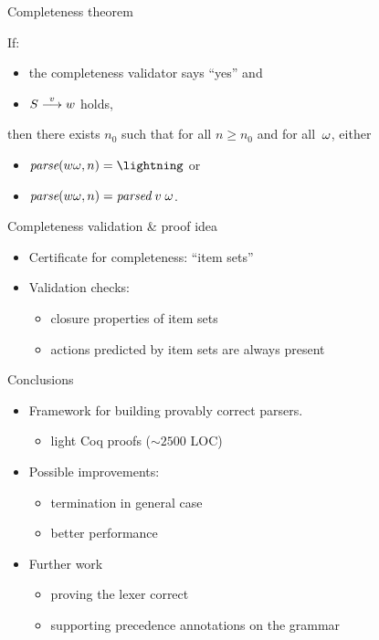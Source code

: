 \documentclass{beamer}
\begin{document}

\begin{frame}{Completeness theorem}
\begin{theorem}[Completeness]
\label{th:complete}
If:
\begin{itemize}
\item the completeness validator says ``yes'' and
\item $S\stackrel{v}{\longrightarrow}w$ holds,
\end{itemize}
then there exists $n_0$ such that for all $n\geq n_0$ and for all~$\omega$, either 
\begin{itemize}
\item $\parse{\word\stream}{n} = \Err$ or
\item $\textit{parse}(w\omega, n) = \textit{parsed}\;v\;\omega$.
\end{itemize}
\end{theorem}
\end{frame}

\begin{frame}{Completeness validation \& proof idea}
\begin{itemize}
\item Certificate for completeness: \lrone ``item sets''
\item Validation checks:
\begin{itemize}
\item closure properties of item sets
\item actions predicted by item sets are always present
\end{itemize}
\end{itemize}
\end{frame}

\begin{frame}{Conclusions}
\begin{itemize}
\item Framework for building provably correct \lrone parsers.
  \begin{itemize}
  \item light Coq proofs ($\sim 2500$ LOC)
  \end{itemize}
\item Possible improvements:
  \begin{itemize}
  \item termination in general case
  \item better performance
  \end{itemize}
\item Further work
  \begin{itemize}
  \item proving the lexer correct
  \item supporting precedence annotations on the grammar
  \end{itemize}
\end{itemize}
\end{frame}

\end{document}

